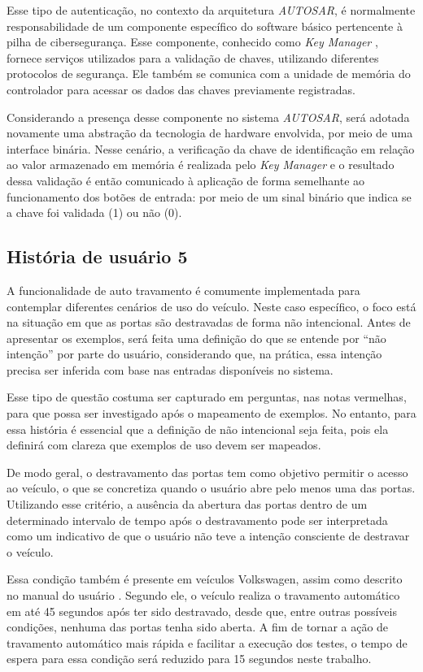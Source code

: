 Esse tipo de autenticação, no contexto da arquitetura \textit{AUTOSAR}, é normalmente responsabilidade de um componente específico do software básico pertencente 
à pilha de cibersegurança. Esse componente, conhecido como \textit{Key Manager} \cite{autosarKeyManager}, fornece serviços utilizados para a validação de chaves, 
utilizando diferentes protocolos de segurança. Ele também se comunica com a unidade de memória do controlador para acessar os dados das chaves previamente registradas.

Considerando a presença desse componente no sistema \textit{AUTOSAR}, será adotada novamente uma abstração da tecnologia de hardware envolvida, por meio de uma interface 
binária. Nesse cenário, a verificação da chave de identificação em relação ao valor armazenado em memória é realizada pelo \textit{Key Manager} e o resultado dessa 
validação é então comunicado à aplicação de forma semelhante ao funcionamento dos botões de entrada: por meio de um sinal binário que indica se a chave foi 
validada (1) ou não (0).

\subsection{História de usuário 5}
A funcionalidade de auto travamento é comumente implementada para contemplar diferentes cenários de uso do veículo. Neste caso específico, o foco está na situação em 
que as portas são destravadas de forma não intencional. Antes de apresentar os exemplos, será feita uma definição do que se entende por ``não intenção'' por parte do 
usuário, considerando que, na prática, essa intenção precisa ser inferida com base nas entradas disponíveis no sistema. 

Esse tipo de questão costuma ser capturado em perguntas, nas notas vermelhas, para que possa ser investigado após o mapeamento de exemplos. No entanto, para essa 
história é essencial que a definição de não intencional seja feita, pois ela definirá com clareza que exemplos de uso devem ser mapeados.

De modo geral, o destravamento das portas tem como objetivo permitir o acesso ao veículo, o que se concretiza quando o usuário abre pelo menos uma das portas. Utilizando 
esse critério, a ausência da abertura das portas dentro de um determinado intervalo de tempo após o destravamento pode ser interpretada como um indicativo de que o 
usuário não teve a intenção consciente de destravar o veículo. 

Essa condição também é presente em veículos Volkswagen, assim como descrito no manual do usuário \cite{vwLocking}. Segundo ele, o veículo realiza o travamento automático 
em até 45 segundos após ter sido destravado, desde que, entre outras possíveis condições, nenhuma das portas tenha sido aberta. A fim de tornar a ação de travamento 
automático mais rápida e facilitar a execução dos testes, o tempo de espera para essa condição será reduzido para 15 segundos neste trabalho.

